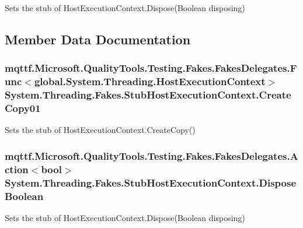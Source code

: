 Sets the stub of Host\-Execution\-Context.\-Dispose(\-Boolean disposing)



\subsection{Member Data Documentation}
\hypertarget{class_system_1_1_threading_1_1_fakes_1_1_stub_host_execution_context_af6753f3746c6e603641cba336361e3f0}{
\subsubsection[{Create\-Copy01}]{\setlength{\rightskip}{0pt plus 5cm}mqttf.\-Microsoft.\-Quality\-Tools.\-Testing.\-Fakes.\-Fakes\-Delegates.\-Func$<$global.\-System.\-Threading.\-Host\-Execution\-Context$>$ System.\-Threading.\-Fakes.\-Stub\-Host\-Execution\-Context.\-Create\-Copy01}}\label{class_system_1_1_threading_1_1_fakes_1_1_stub_host_execution_context_af6753f3746c6e603641cba336361e3f0}


Sets the stub of Host\-Execution\-Context.\-Create\-Copy()

\hypertarget{class_system_1_1_threading_1_1_fakes_1_1_stub_host_execution_context_a64ee877f53d4f0f9b0e2a570743f1e71}{
\subsubsection[{Dispose\-Boolean}]{\setlength{\rightskip}{0pt plus 5cm}mqttf.\-Microsoft.\-Quality\-Tools.\-Testing.\-Fakes.\-Fakes\-Delegates.\-Action$<$bool$>$ System.\-Threading.\-Fakes.\-Stub\-Host\-Execution\-Context.\-Dispose\-Boolean}}\label{class_system_1_1_threading_1_1_fakes_1_1_stub_host_execution_context_a64ee877f53d4f0f9b0e2a570743f1e71}


Sets the stub of Host\-Execution\-Context.\-Dispose(\-Boolean disposing)



